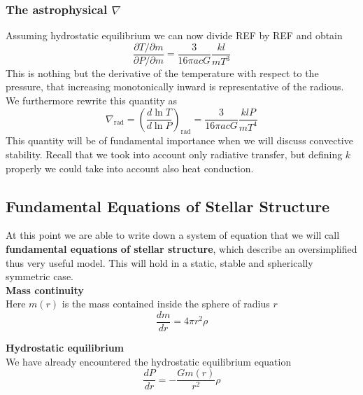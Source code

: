 \documentclass[11pt]{article}
\begin{document}
\subsubsection{The astrophysical $\nabla$}
Assuming hydrostatic equilibrium we can now divide REF by REF and obtain
\begin{equation}
	\frac{\partial T/\partial m}{\partial P / \partial m} = \frac{3}{16 \pi a c G} \frac{k l}{m T^3}
\end{equation}
This is nothing but the derivative of the temperature with respect to the pressure, that increasing monotonically inward is representative of the radious. We furthermore rewrite this quantity as
\begin{equation}\label{nablarad}
	\nabla_{\mathrm{rad}} = \left( \frac{d \ln T}{d \ln P}  \right)_{\mathrm{rad}}= \frac{3}{16 \pi a c G} \frac{k l P}{m T^4}
\end{equation}
This quantity will be of fundamental importance when we will discuss convective stability. Recall that we took into account only radiative transfer, but defining $k$ properly we could take into account also heat conduction.
\subsection{Fundamental Equations of Stellar Structure}
At this point we are able to write down a system of equation that we will call \textbf{fundamental equations of stellar structure}, which describe an oversimplified thus very useful model. This will hold in a static, stable and spherically symmetric case.\\

\textbf{Mass continuity} \\
Here $m(r)$ is the mass contained inside the sphere of radius $r$
\begin{equation}\label{masscons}
	\frac{dm}{dr}=4 \pi r^2 \rho
\end{equation}

\textbf{Hydrostatic equilibrium} \\
We have already encountered the hydrostatic equilibrium equation
\begin{equation}\label{hydroeq}
	\frac{dP}{dr}= - \frac{G m(r)}{r^2} \rho
\end{equation}
\end{document}
